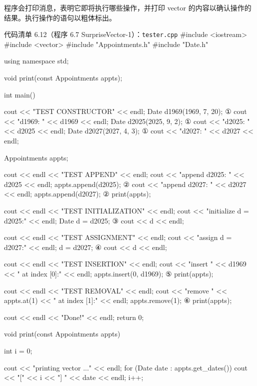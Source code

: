 程序会打印消息，表明它即将执行哪些操作，并打印 vector 的内容以确认操作的结果。执行操作的语句以粗体标出。

\begin{codeboxt}{代码清单 6.12（程序 6.7 SurpriseVector-1）：\texttt{tester.\allowbreak{}cpp}}
#include <iostream>
#include <vector>
#include "Appointments.h"
#include "Date.h"

using namespace std;

void print(const Appointments appts);

int main()
{
    cout << "TEST CONSTRUCTOR" << endl;
    Date d1969(1969, 7, 20);                     ①
    cout << "d1969: " << d1969 << endl;
    Date d2025(2025, 9,  2);                     ①
    cout << "d2025: " << d2025 << endl;
    Date d2027(2027, 4,  3);                     ①
    cout << "d2027: " << d2027 << endl;

    Appointments appts;

    cout << endl << "TEST APPEND" << endl;
    cout << "append d2025: " << d2025 << endl;
    appts.append(d2025);                         ②
    cout << "append d2027: " << d2027 << endl;
    appts.append(d2027);                         ②
    print(appts);

    cout << endl << "TEST INITIALIZATION" << endl;
    cout << "initialize d = d2025:" << endl;
    Date d = d2025;                              ③
    cout << d << endl;

    cout << endl << "TEST ASSIGNMENT" << endl;
    cout << "assign d = d2027:" << endl;
    d = d2027;                                   ④
    cout << d << endl;

    cout << endl << "TEST INSERTION" << endl;
    cout << "insert " << d1969
         << " at index [0]:" << endl;
    appts.insert(0, d1969);                      ⑤
    print(appts);

    cout << endl << "TEST REMOVAL" << endl;
    cout << "remove " << appts.at(1)
         << " at index [1]:" << endl;
    appts.remove(1);                             ⑥
    print(appts);

    cout << endl << "Done!" << endl;
    return 0;
}

void print(const Appointments appts)
{
    int i = 0;

    cout << "printing vector ..." << endl;
    for (Date date : appts.get_dates())
    {
        cout << "[" << i << "] " << date << endl;
        i++;
    }
}
\end{codeboxt}
\par
{}\par
{}\par
{}\par
{}\par
{}\par

